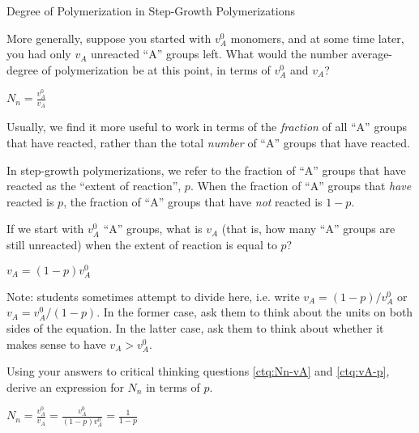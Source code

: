 \begin{activity}{Degree of Polymerization in Step-Growth Polymerizations}
\begin{ctqs}
		\question \label{ctq:Nn-vA} More generally, suppose you started with $v_A^0$ monomers, and at some time later, you had only $v_A$ unreacted ``A'' groups left.  What would the number average-degree of polymerization be at this point, in terms of $v_A^0$ and $v_A$?
				
					\begin{solution}[0.75in]
						$N_n = \frac{v_A^0}{v_A}$
					\end{solution}
		
\end{ctqs}
	
\begin{infobox}

Usually, we find it more useful to work in terms of the \emph{fraction} of all ``A'' groups that have reacted, rather than the total \emph{number} of ``A'' groups that have reacted.

In step-growth polymerizations, we refer to the fraction of ``A'' groups that have reacted as the ``extent of reaction'', $p$.
When the fraction of ``A'' groups that \emph{have} reacted is $p$, the fraction of ``A'' groups that have \emph{not} reacted is $1-p$.

\end{infobox}
	
\begin{ctqs}
		
		\question \label{ctq:vA-p} If we start with $v_A^0$ ``A'' groups, what is $v_A$ (that is, how many ``A'' groups are still unreacted) when the extent of reaction is equal to $p$?
		
		\begin{solution}[1in]
			$v_A = (1-p)v_A^0$
			
			Note: students sometimes attempt to divide here, i.e. write $v_A = (1-p)/v_A^0$ or $v_A = v_A^0/(1-p)$. In the former case, ask them to think about the units on both sides of the equation.  In the latter case, ask them to think about whether it makes sense to have $v_A > v_A^0$.
		\end{solution}
		
		\question Using your answers to critical thinking questions \ref{ctq:Nn-vA} and \ref{ctq:vA-p}, derive an expression for $N_n$ in terms of $p$.
		
		\begin{solution}[1in]
			$N_n = \frac{v_A^0}{v_A} = \frac{v_A^0}{(1-p)v_A^0} = \frac{1}{1-p}$
		\end{solution}
		
\end{ctqs}


\end{activity}
